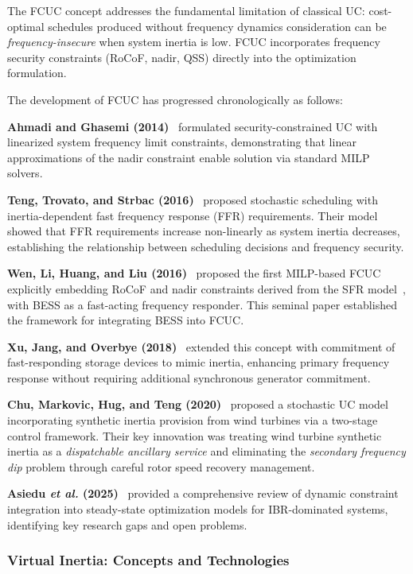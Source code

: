 \documentclass[journal]{IEEEtran}
\begin{document}
The FCUC concept addresses the fundamental limitation of classical
UC: cost-optimal schedules produced without frequency dynamics
consideration can be \textit{frequency-insecure} when system inertia
is low. FCUC incorporates frequency security constraints (RoCoF,
nadir, QSS) directly into the optimization formulation.

The development of FCUC has progressed chronologically as follows:

\textbf{Ahmadi and Ghasemi (2014)}~\cite{Ahmadi2014} formulated
security-constrained UC with linearized system frequency limit
constraints, demonstrating that linear approximations of the nadir
constraint enable solution via standard MILP solvers.

\textbf{Teng, Trovato, and Strbac (2016)}~\cite{Teng2016} proposed
stochastic scheduling with inertia-dependent fast frequency response
(FFR) requirements. Their model showed that FFR requirements increase
non-linearly as system inertia decreases, establishing the
relationship between scheduling decisions and frequency security.

\textbf{Wen, Li, Huang, and Liu (2016)}~\cite{Wen2016} proposed the
first MILP-based FCUC explicitly embedding RoCoF and nadir
constraints derived from the SFR model~\cite{Anderson1990}, with
BESS as a fast-acting frequency responder. This seminal paper
established the framework for integrating BESS into FCUC.

\textbf{Xu, Jang, and Overbye (2018)}~\cite{Xu2018} extended this
concept with commitment of fast-responding storage devices to mimic
inertia, enhancing primary frequency response without requiring
additional synchronous generator commitment.

\textbf{Chu, Markovic, Hug, and Teng (2020)}~\cite{Chu2020} proposed
a stochastic UC model incorporating synthetic inertia provision
from wind turbines via a two-stage control framework. Their key
innovation was treating wind turbine synthetic inertia as a
\textit{dispatchable ancillary service} and eliminating the
\textit{secondary frequency dip} problem through careful rotor
speed recovery management.

\textbf{Asiedu \textit{et al.} (2025)}~\cite{Asiedu2025} provided
a comprehensive review of dynamic constraint integration into
steady-state optimization models for IBR-dominated systems,
identifying key research gaps and open problems.

\subsubsection{Virtual Inertia: Concepts and Technologies}
\end{document}
